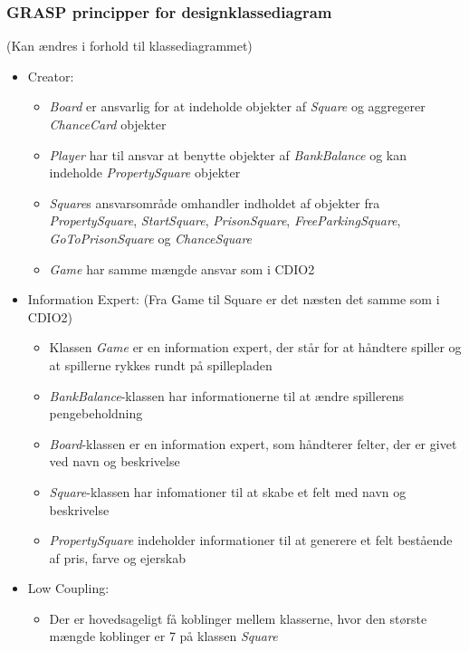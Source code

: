 \documentclass[../main.tex]{subfiles}
\begin{document}
\subsubsection{GRASP principper for designklassediagram}
\TODO (Kan ændres i forhold til klassediagrammet)
\begin{flushleft}
\begin{itemize}
    \item Creator: 
    \begin{itemize}
        \item  \textit{Board} er ansvarlig for at indeholde objekter af \textit{Square} og aggregerer \textit{ChanceCard} objekter
        \item  \textit{Player} har til ansvar at benytte objekter af \textit{BankBalance} og kan indeholde \textit{PropertySquare} objekter
        \item \textit{Square}s ansvarsområde omhandler indholdet af objekter fra \textit{PropertySquare}, \textit{StartSquare}, \textit{PrisonSquare}, \textit{FreeParkingSquare}, \textit{GoToPrisonSquare} og \textit{ChanceSquare}
        \item \textit{Game} har samme mængde ansvar som i CDIO2
    \end{itemize}
    \item Information Expert: (Fra Game til Square er det næsten det samme som i CDIO2)
    \begin{itemize}
        \item Klassen \textit{Game} er en information expert, der står for at håndtere spiller og at spillerne rykkes rundt på spillepladen
        \item \textit{BankBalance}-klassen har informationerne til at ændre spillerens pengebeholdning
        \item \textit{Board}-klassen er en information expert, som håndterer felter, der er givet ved navn og beskrivelse
        \item \textit{Square}-klassen har infomationer til at skabe et felt med navn og beskrivelse
        \item \textit{PropertySquare} indeholder informationer til at generere et felt bestående af pris, farve og ejerskab
    \end{itemize}
    \item Low Coupling:
    \begin{itemize}
        \item Der er hovedsageligt få koblinger mellem klasserne, hvor den største mængde koblinger er 7 på klassen \textit{Square}

\end{itemize}
\end{itemize}
\end{flushleft}
\end{document}
